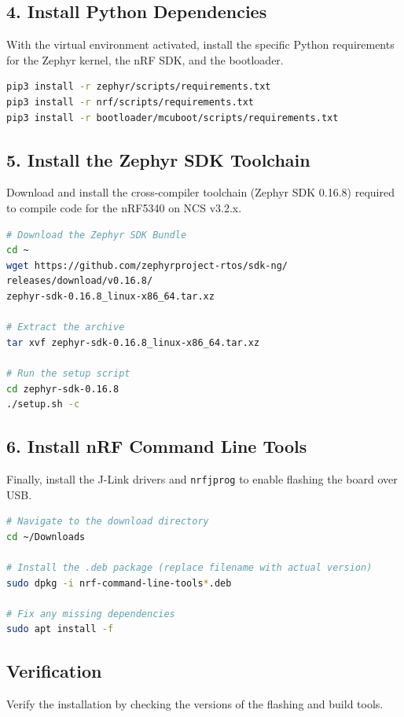 \documentclass[conference]{IEEEtran}
\begin{document}
\subsection{4. Install Python Dependencies}
With the virtual environment activated, install the specific Python requirements for the Zephyr kernel, the nRF SDK, and the bootloader.

\begin{lstlisting}[language=bash]
pip3 install -r zephyr/scripts/requirements.txt
pip3 install -r nrf/scripts/requirements.txt
pip3 install -r bootloader/mcuboot/scripts/requirements.txt
\end{lstlisting}

\subsection{5. Install the Zephyr SDK Toolchain}
Download and install the cross-compiler toolchain (Zephyr SDK 0.16.8) required to compile code for the nRF5340 on NCS v3.2.x.

\begin{lstlisting}[language=bash]
# Download the Zephyr SDK Bundle
cd ~
wget https://github.com/zephyrproject-rtos/sdk-ng/
releases/download/v0.16.8/
zephyr-sdk-0.16.8_linux-x86_64.tar.xz

# Extract the archive
tar xvf zephyr-sdk-0.16.8_linux-x86_64.tar.xz

# Run the setup script
cd zephyr-sdk-0.16.8
./setup.sh -c
\end{lstlisting}

\subsection{6. Install nRF Command Line Tools}
Finally, install the J-Link drivers and \texttt{nrfjprog} to enable flashing the board over USB.

\begin{lstlisting}[language=bash]
# Navigate to the download directory
cd ~/Downloads

# Install the .deb package (replace filename with actual version)
sudo dpkg -i nrf-command-line-tools*.deb

# Fix any missing dependencies
sudo apt install -f
\end{lstlisting}

\subsection{Verification}
Verify the installation by checking the versions of the flashing and build tools.
\end{document}
